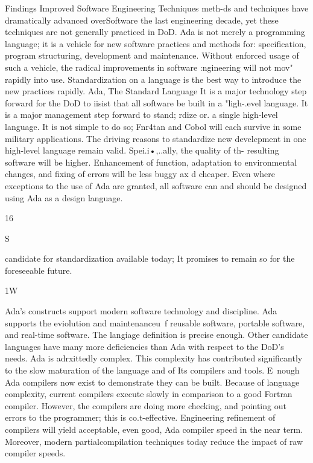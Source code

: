\documentclass[12pt]{article}
\begin{document}
Findings
Improved Software Engineering Techniques
meth-ds and techniques have dramatically advanced
overSoftware
the last engineering
decade, yet these techniques are not generally practiced in DoD.
Ada is not merely a programming language; it is a vehicle for new software practices and
methods for: specification, program structuring, development and maintenance. Without
enforced usage of such a vehicle, the radical improvements in software :ngineering will not
mov" rapidly into use. Standardization on a language is the best way to introduce the new
practices rapidly.
Ada, The Standard Language
It is a major technology step forward for the DoD to iisist that all software
be built in a "ligh-.evel language. It is a major management step forward to
stand; rdize or. a single high-level language.
It is not simple to do so; Fnr4tan and Cobol will each survive in some military
applications. The driving reasons to standardize new develcpment in one high-level
language remain valid. Spei.i•,..ally, the quality of th- resulting software will be higher.
Enhancement of function, adaptation to environmental changes, and fixing of errors will
be less buggy ax d cheaper.
Even where exceptions to the use of Ada are granted, all software can and should be
designed using Ada as a design language.

16

S

candidate for standardization available today; It promises to remain so for the
foreseeable future.

1W

Ada's constructs support modern software technology and discipline. Ada supports the
eviolution and maintenanceu~f reusable software, portable software, and real-time software.
The langiage definition is precise enough. Other candidate languages have many more
deficiencies than Ada with respect to the DoD's needs.
Ada is adrxittedly complex. This complexity has contributed significantly
to the slow maturation of the language and of Its compilers and tools.
E~nough Ada compilers now exist to demonstrate they can be built. Because of
language complexity, current compilers execute slowly in comparison to a good Fortran
compiler. However, the compilers are doing more checking, and pointing out errors to
the programmer; this is co.t-effective. Engineering refinement of compilers will yield
acceptable, even good, Ada compiler speed in the near term. Moreover, modern partialcompilation techniques today reduce the impact of raw compiler speeds.
\end{document}
